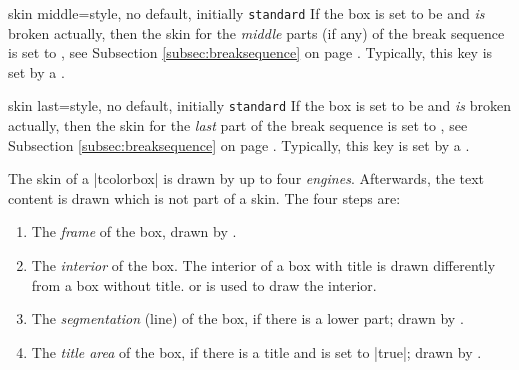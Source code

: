 \begin{docTcbKey}{skin middle}{=}{style, no default, initially \texttt{standard}}
  If the box is set to be  and \emph{is} broken actually,
  then the skin for the \emph{middle} parts (if any) of the break sequence
  is set to , see Subsection \ref{subsec:breaksequence} on page \pageref{subsec:breaksequence}.
  Typically, this key is set by a .
\end{docTcbKey}


\begin{docTcbKey}{skin last}{=}{style, no default, initially \texttt{standard}}
  If the box is set to be  and \emph{is} broken actually,
  then the skin for the \emph{last} part of the break sequence
  is set to , see Subsection \ref{subsec:breaksequence} on page \pageref{subsec:breaksequence}.
  Typically, this key is set by a .
\end{docTcbKey}


\clearpage

The skin of a |tcolorbox| is drawn by up to four \emph{engines}.
Afterwards, the text content is drawn which is not part of a skin.
The four steps are:
\begin{enumerate}
\item The \emph{frame} of the box, drawn by .
\item The \emph{interior} of the box. The interior of a box with title is
  drawn differently from a box without title.
   or 
  is used to draw the interior.
\item The \emph{segmentation} (line) of the box, if there is a lower part;
  drawn by .
\item The \emph{title area} of the box, if there is a title and
   is set to |true|; drawn
  by .
\end{enumerate}

